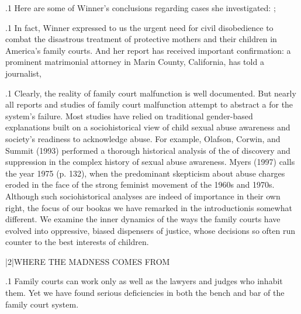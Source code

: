 \documentclass[11pt, twoside]{article}
\begin{document}
{\p.1{%
\:Here are some of Winner’s conclusions regarding cases she investigated: ; \;
}%

\p.1{%
\:In fact, Winner expressed to us the urgent need for civil disobedience to combat the disastrous treatment of protective mothers and their
children in America’s family courts. And her report has received important confirmation: a prominent matrimonial attorney in Marin County,
California, has told a journalist, \;
}%

\p.1{%
\:Clearly, the reality of family court malfunction is well documented.
But nearly all reports and studies of family court malfunction attempt to
abstract a  for the system’s failure. Most studies have relied
on traditional gender-based explanations built on a sociohistorical view
of child sexual abuse awareness and society’s readiness to acknowledge
abuse. For example, Olafson, Corwin, and Summit (1993) performed a
thorough historical analysis of the  of discovery and suppression
in the complex history of sexual abuse awareness. Myers (1997) calls
the year 1975  (p. 132),
when the predominant skepticism about abuse charges eroded in the
face of the strong feminist movement of the 1960s and 1970s.
Although such sociohistorical analyses are indeed of importance in
their own right, the focus of our book\mdash{}as we have remarked in the
introduction\mdash{}is somewhat different. We examine the inner dynamics
of the ways the family courts have evolved
into oppressive, biased dispensers of justice, whose decisions so often run counter to the best interests of children.\;
}%


\s|2|{WHERE THE MADNESS COMES FROM}

\p.1{%
\noindent{}\:Family courts can work only as well as the lawyers and judges who inhabit them. Yet we have found serious deficiencies in both the bench and
bar of the family court system.\;
}%


}
\end{document}
